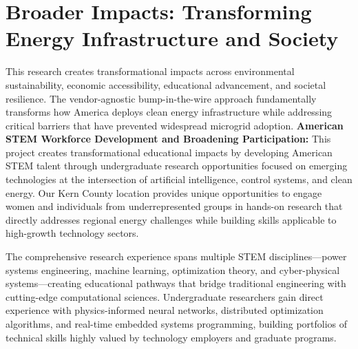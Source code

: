 \documentclass[12pt]{article}
\begin{document}
\section{Broader Impacts: Transforming Energy Infrastructure and Society}

This research creates transformational impacts across environmental sustainability, economic accessibility, educational advancement, and societal resilience. The vendor-agnostic bump-in-the-wire approach fundamentally transforms how America deploys clean energy infrastructure while addressing critical barriers that have prevented widespread microgrid adoption.
\textbf{American STEM Workforce Development and Broadening Participation:} This project creates transformational educational impacts by developing American STEM talent through undergraduate research opportunities focused on emerging technologies at the intersection of artificial intelligence, control systems, and clean energy. Our Kern County location provides unique opportunities to engage women and individuals from underrepresented groups in hands-on research that directly addresses regional energy challenges while building skills applicable to high-growth technology sectors.

The comprehensive research experience spans multiple STEM disciplines---power systems engineering, machine learning, optimization theory, and cyber-physical systems---creating educational pathways that bridge traditional engineering with cutting-edge computational sciences. Undergraduate researchers gain direct experience with physics-informed neural networks, distributed optimization algorithms, and real-time embedded systems programming, building portfolios of technical skills highly valued by technology employers and graduate programs.





\end{document}
